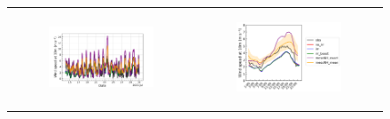 \begin{figure}[hbtp]
\begin{tabular}{cc}
        \begin{subfigure}[t]{0.5\textwidth}
            \caption{}
            \includegraphics[width=\textwidth]{images/chap5/SOP_TS_DC/time_series_elsplans_wind_speed_10m.png}
        \end{subfigure} &
        \begin{subfigure}[t]{0.5\textwidth}
            \caption{}
            \includegraphics[width=\textwidth]{images/chap5/SOP_TS_DC/diurnal_cycle_elsplans_wind_speed_10m.png}
        \end{subfigure} \\
        

\end{tabular}
\end{figure}
